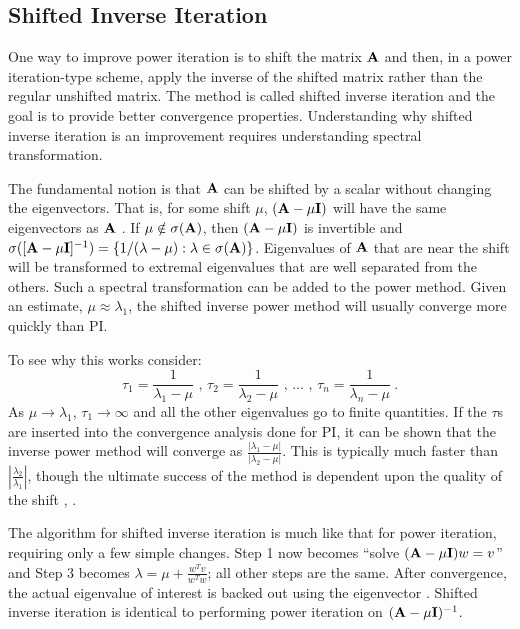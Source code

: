 \subsection{Shifted Inverse Iteration}
One way to improve power iteration is to shift the matrix $\mathbf{A}$ and then, in a power iteration-type scheme, apply the inverse of the shifted matrix rather than the regular unshifted matrix. The method is called shifted inverse iteration and the goal is to provide better convergence properties. Understanding why shifted inverse iteration is an improvement requires understanding spectral transformation. 

The fundamental notion is that $\mathbf{A}$ can be shifted by a scalar without changing the eigenvectors. That is, for some shift $\mu$, $(\mathbf{A} - \mu \mathbf{I})$ will have the same eigenvectors as $\mathbf{A}$ \cite{Sorensen1996}. If $\mu \notin \sigma(\mathbf{A})$, then $(\mathbf{A} - \mu \mathbf{I})$ is invertible and $\sigma([\mathbf{A} - \mu \mathbf{I}]^{-1}) = \{1/(\lambda - \mu):\lambda \in \sigma(\mathbf{A})\}$. Eigenvalues of $\mathbf{A}$ that are near the shift will be transformed to extremal eigenvalues that are well separated from the others. Such a spectral transformation can be added to the power method. Given an estimate, $\mu \approx \lambda_1$, the shifted inverse power method will usually converge more quickly than PI.

To see why this works consider: 
%
\begin{equation}
    \tau_1 = \frac{1}{\lambda_1 - \mu}\text{ , }\tau_2 = \frac{1}{\lambda_2 - \mu}\text{ , }\dots\text{ , }\tau_n = \frac{1}{\lambda_n - \mu} \:.
\end{equation}
%
As $\mu \to \lambda_1$, $\tau_1 \to \infty$ and all the other eigenvalues go to finite quantities. If the $\tau$s are inserted into the convergence analysis done for PI, it can be shown that the inverse power method will converge as $\frac{|\lambda_{1} - \mu|}{|\lambda_{2} - \mu|}$. This is typically much faster than $|\frac{\lambda_{2}}{\lambda_{1}}|$, though the ultimate success of the method is dependent upon the quality of the shift \cite{Sorensen1996}, \cite{Trefethen1997}. 

The algorithm for shifted inverse iteration is much like that for power iteration, requiring only a few simple changes. Step 1 now becomes ``solve $(\mathbf{A}-\mu \mathbf{I})w = v$'' and Step 3 becomes $\lambda = \mu + \frac{w^{T}v}{w^{T}w}$; all other steps are the same. After convergence, the actual eigenvalue of interest is backed out using the eigenvector \cite{Sorensen1996}.  Shifted inverse iteration is identical to performing power iteration on $(\mathbf{A}-\mu \mathbf{I})^{-1}$. 

